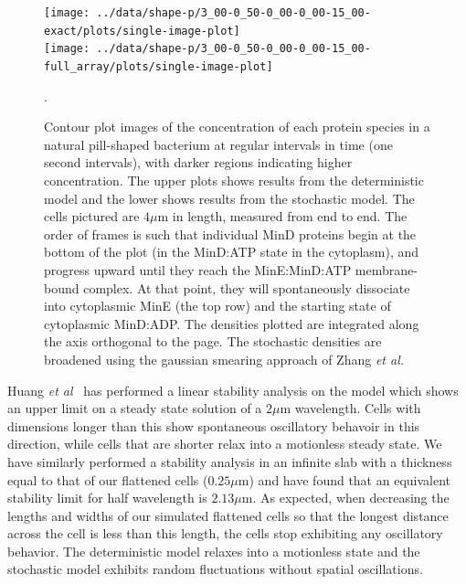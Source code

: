\documentclass[letterpaper,twocolumn,amsmath,amssymb,pre]{revtex4-1}
\newcommand{\red}[1]{{\bf \color{red} #1}}
\newcommand{\fixme}[1]{\red{[#1]}}
\newcommand\micron{\ensuremath{\mu\text{m}}}
\begin{document}

\begin{figure}
  \begin{center}
    \texttt{[image: ../data/shape-p/3\_00-0\_50-0\_00-0\_00-15\_00-exact/plots/single-image-plot]}\\
    \vspace{-2.5em}
    \texttt{[image: ../data/shape-p/3\_00-0\_50-0\_00-0\_00-15\_00-full\_array/plots/single-image-plot]}
    \vspace{-3em}
  \end{center}
  \caption{Contour plot images of the concentration of each protein
    species in a natural pill-shaped bacterium at regular intervals in
    time (one second intervals), with darker regions indicating higher
    concentration. The upper plots shows results from the
    deterministic model and the lower shows results from the
    stochastic model.  The cells pictured are $4\micron$ in length,
    measured from end to end.  The order of frames is such that
    individual MinD proteins begin at the bottom of the plot (in the
    MinD:ATP state in the cytoplasm), and progress upward until they
    reach the MinE:MinD:ATP membrane-bound complex.  At that point,
    they will spontaneously dissociate into cytoplasmic MinE (the top
    row) and the starting state of cytoplasmic MinD:ADP.  The
    densities plotted are integrated along the axis orthogonal to the
    page.  The stochastic densities are broadened using the gaussian
    smearing approach of Zhang \emph{et
      al.}~\cite{zhang2007gaussian}}.
  \label{image-p}
\end{figure}

Huang \emph{et al}~\cite{huang2003dynamic} has performed a linear
stability analysis on the model which shows an upper limit on a steady
state solution of a $2\micron$ wavelength.  Cells with dimensions longer
than this show spontaneous oscillatory behavoir in this
direction, while cells that are shorter relax into a motionless steady
state.  We have similarly performed a stability analysis in an
infinite slab with a thickness equal to that of our flattened cells
($0.25\micron$) and have found that an equivalent stability limit for
half wavelength is $2.13\micron$. As expected, when decreasing the
lengths and widths of our simulated flattened cells so that the
longest distance across the cell is less than this length, the cells
stop exhibiting any oscillatory behavior.  The deterministic model
relaxes into a motionless state and the stochastic model exhibits
random fluctuations without spatial oscillations.
\end{document}
